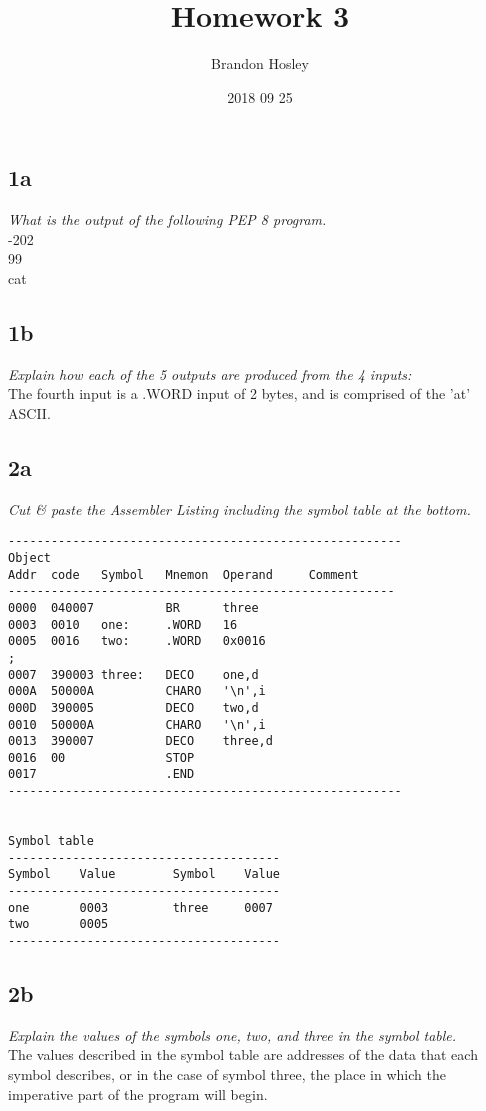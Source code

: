 \documentclass[a4paper,man,natbib]{apa6}
\title{Homework 3}
\author{Brandon Hosley}
\date{2018 09 25}
\affiliation{Mike Davis}
\begin{document}
\maketitle
\singlespacing
\raggedbottom
\subsection{1a}
\emph{What is the output of the following PEP 8 program.} \\
-202 \\
99 \\
cat \\
\subsection{1b}
\emph{Explain how each of the 5 outputs are produced from the 4 inputs:} \\
The fourth input is a .WORD input of 2 bytes, and is comprised of the 'at' ASCII.
\subsection{2a}
\emph{Cut \& paste the Assembler Listing including the symbol table at the bottom.} \\
	\begin{Verbatim}
-------------------------------------------------------
Object
Addr  code   Symbol   Mnemon  Operand     Comment
------------------------------------------------------
0000  040007          BR      three       
0003  0010   one:     .WORD   16          
0005  0016   two:     .WORD   0x0016      
;
0007  390003 three:   DECO    one,d       
000A  50000A          CHARO   '\n',i      
000D  390005          DECO    two,d       
0010  50000A          CHARO   '\n',i      
0013  390007          DECO    three,d     
0016  00              STOP                
0017                  .END                  
-------------------------------------------------------


Symbol table
--------------------------------------
Symbol    Value        Symbol    Value
--------------------------------------
one       0003         three     0007
two       0005         
--------------------------------------
	\end{Verbatim}
\subsection{2b}
\emph{Explain the values of the symbols one, two, and three in the symbol table.} \\
The values described in the symbol table are addresses of the data that each symbol describes, or in the case of symbol three, the place in which the imperative part of the program will begin.
\end{document}
